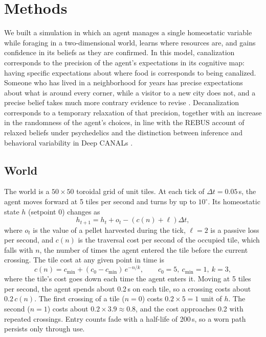 \documentclass[12pt,fleqn]{article}
\begin{document}
\section{Methods}

We built a simulation in which an agent manages a single homeostatic variable while foraging in a two-dimensional world, learns where resources are, and gains confidence in its beliefs as they are confirmed. In this model, canalization corresponds to the precision of the agent's expectations in its cognitive map: having specific expectations about where food is corresponds to being canalized. Someone who has lived in a neighborhood for years has precise expectations about what is around every corner, while a visitor to a new city does not, and a precise belief takes much more contrary evidence to revise \citep{yon_precision_2021}. Decanalization corresponds to a temporary relaxation of that precision, together with an increase in the randomness of the agent's choices, in line with the REBUS account of relaxed beliefs under psychedelics \citep{carhart-harris_rebus_2019} and the distinction between inference and behavioral variability in Deep CANALs \citep{juliani_deep_2024}.

\subsection{World}\label{sec:world}

The world is a $50\times50$ toroidal grid of unit tiles. At each tick of $\Delta t=0.05$\,s, the agent moves forward at 5 tiles per second and turns by up to $10^\circ$. Its homeostatic state $h$ (setpoint 0) changes as
\begin{equation}\label{eq:h}
  h_{t+1}=h_t+o_t-\left(c(n)+\ell\right)\Delta t,
\end{equation}
where $o_t$ is the value of a pellet harvested during the tick, $\ell=2$ is a passive loss per second, and $c(n)$ is the traversal cost per second of the occupied tile, which falls with $n$, the number of times the agent entered the tile before the current crossing. The tile cost at any given point in time is
\begin{equation}\label{eq:wear}
  c(n)=c_{\min}+(c_0-c_{\min})\,e^{-n/k},\qquad c_0=5,\ c_{\min}=1,\ k=3,
\end{equation}
where the tile's cost goes down each time the agent enters it. Moving at 5 tiles per second, the agent spends about 0.2\,s on each tile, so a crossing costs about $0.2\,c(n)$. The first crossing of a tile ($n=0$) costs $0.2\times5=1$ unit of $h$. The second ($n=1$) costs about $0.2\times3.9\approx0.8$, and the cost approaches 0.2 with repeated crossings. Entry counts fade with a half-life of 200\,s, so a worn path persists only through use.
\end{document}
